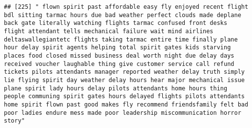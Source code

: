 \documentclass[
]{article}
\begin{document}
\begin{verbatim}
## [225] " flown spirit past affordable easy fly enjoyed recent flight bdl sitting tarmac hours due bad weather perfect clouds made deplane back gate literally watching flights tarmac confused front desks flight attendant tells mechanical failure wait mind airlines deltaswallegiantetc flights taking tarmac entire time finally plane hour delay spirit agents helping total spirit gates kids starving places food closed missed business deal worth night due delay days received voucher laughable thing give customer service call refund tickets pilots attendants manager reported weather delay truth simply lie flying spirit day weather delay hours hear major mechanical issue plane spirit lady hours delay pilots attendants home hours thing people communing spirit gates hours delayed flights pilots attendants home spirit flown past good makes fly recommend friendsfamily felt bad poor ladies endure mess made poor leadership miscommunication horror story"                                                                                                                                                                                                                                                                                                                                                                                                                                                                                                                                                                                                                                                                                                                                                                                                              

\end{verbatim}
\end{document}
